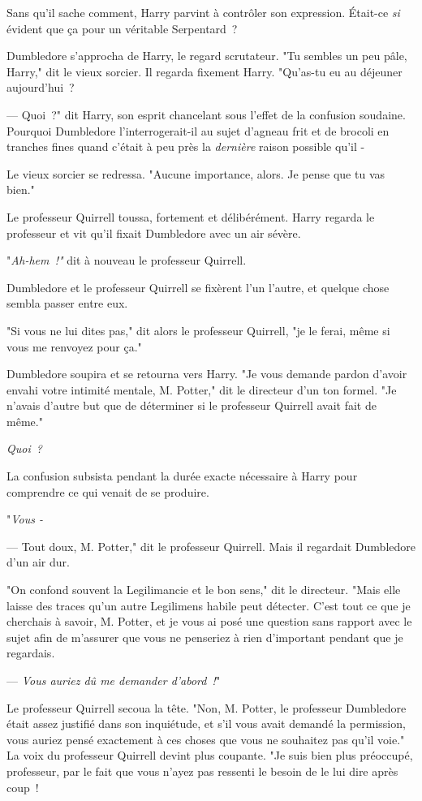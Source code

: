 Sans qu'il sache comment, Harry parvint à contrôler son expression. Était-ce \emph{si} évident que ça pour un véritable Serpentard~?

Dumbledore s'approcha de Harry, le regard scrutateur. "Tu sembles un peu pâle, Harry," dit le vieux sorcier. Il regarda fixement Harry. "Qu'as-tu eu au déjeuner aujourd'hui~?

--- Quoi~?" dit Harry, son esprit chancelant sous l'effet de la confusion soudaine. Pourquoi Dumbledore l'interrogerait-il au sujet d'agneau frit et de brocoli en tranches fines quand c'était à peu près la \emph{dernière} raison possible qu'il -

Le vieux sorcier se redressa. "Aucune importance, alors. Je pense que tu vas bien."

Le professeur Quirrell toussa, fortement et délibérément. Harry regarda le professeur et vit qu'il fixait Dumbledore avec un air sévère.

"\emph{Ah-hem~!"} dit à nouveau le professeur Quirrell.

Dumbledore et le professeur Quirrell se fixèrent l'un l'autre, et quelque chose sembla passer entre eux.

"Si vous ne lui dites pas," dit alors le professeur Quirrell, "je le ferai, même si vous me renvoyez pour ça."

Dumbledore soupira et se retourna vers Harry. "Je vous demande pardon d'avoir envahi votre intimité mentale, M. Potter," dit le directeur d'un ton formel. "Je n'avais d'autre but que de déterminer si le professeur Quirrell avait fait de même."

\emph{Quoi~?}

La confusion subsista pendant la durée exacte nécessaire à Harry pour comprendre ce qui venait de se produire.

"\emph{Vous -}

--- Tout doux, M. Potter," dit le professeur Quirrell. Mais il regardait Dumbledore d'un air dur.

"On confond souvent la Legilimancie et le bon sens," dit le directeur. "Mais elle laisse des traces qu'un autre Legilimens habile peut détecter. C'est tout ce que je cherchais à savoir, M. Potter, et je vous ai posé une question sans rapport avec le sujet afin de m'assurer que vous ne penseriez à rien d'important pendant que je regardais.

--- \emph{Vous auriez dû me demander d'abord~!}"

Le professeur Quirrell secoua la tête. "Non, M. Potter, le professeur Dumbledore était assez justifié dans son inquiétude, et s'il vous avait demandé la permission, vous auriez pensé exactement à ces choses que vous ne souhaitez pas qu'il voie." La voix du professeur Quirrell devint plus coupante. "Je suis bien plus préoccupé, professeur, par le fait que vous n'ayez pas ressenti le besoin de le lui dire après coup~!

